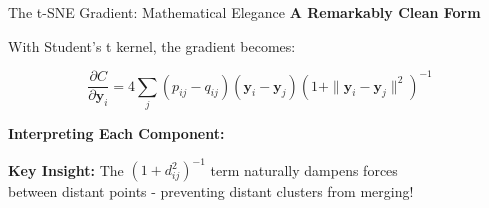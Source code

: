 \documentclass[10pt]{beamer}
\newcommand{\emphtext}[1]{\textcolor{upcblue}{\textbf{#1}}}
\begin{document}
\begin{frame}{The t-SNE Gradient: Mathematical Elegance}
\emphtext{A Remarkably Clean Form}

\vspace{0.3cm}
With Student's t kernel, the gradient becomes:

\begin{center}
\colorbox{upcblue!10}{
\begin{minipage}{0.85\textwidth}
\centering
$$\frac{\partial C}{\partial \mathbf{y}_i} = 4\sum_j (p_{ij} - q_{ij})(\mathbf{y}_i - \mathbf{y}_j)(1 + \|\mathbf{y}_i - \mathbf{y}_j\|^2)^{-1}$$
\end{minipage}
}
\end{center}

\vspace{0.3cm}
\textbf{Interpreting Each Component:}

\begin{center}
\end{center}

\vspace{0.2cm}
\emphtext{Key Insight:} The $(1+d_{ij}^2)^{-1}$ term naturally dampens forces\\
between distant points - preventing distant clusters from merging!
\end{frame}
\end{document}

